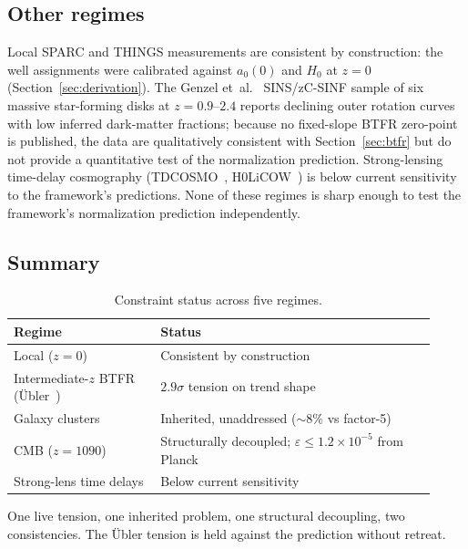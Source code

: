 \documentclass[11pt,a4paper]{article}
\numberwithin{equation}{section}
\numberwithin{table}{section}
\numberwithin{figure}{section}
\newcommand{\afid}{a_0}
\begin{document}
\subsection{Other regimes}
\label{sec:other-regimes}

Local SPARC and THINGS measurements are consistent by construction: the
well assignments were calibrated against $\afid(0)$ and $H_0$ at
$z = 0$ (Section~\ref{sec:derivation}). The Genzel et~al.\ \citep{Genzel2017}
SINS/zC-SINF sample of six massive star-forming disks at
$z = 0.9$--$2.4$ reports declining outer rotation curves with low
inferred dark-matter fractions; because no fixed-slope BTFR zero-point
is published, the data are qualitatively consistent with
Section~\ref{sec:btfr} but do not provide a quantitative test of the
normalization prediction. Strong-lensing time-delay cosmography
(TDCOSMO~\citep{Millon2020}, H0LiCOW~\citep{Wong2020}) is below current
sensitivity to the framework's predictions. None of these regimes is
sharp enough to test the framework's normalization prediction
independently.

\subsection{Summary}
\label{sec:constraint-summary}

\begin{table}[!ht]
\centering
\caption{Constraint status across five regimes.}
\label{tab:constraint-status}
\small
\begin{tabular}{p{0.32\linewidth} p{0.60\linewidth}}
\toprule
Regime & Status \\
\midrule
Local ($z = 0$)                        & Consistent by construction \\
Intermediate-$z$ BTFR ({\"U}bler~\citep{Ubler2017}) & $2.9\sigma$ tension on trend shape \\
Galaxy clusters~\citep{Pointecouteau2005}          & Inherited, unaddressed ($\sim 8\%$ vs factor-5) \\
CMB ($z = 1090$)                       & Structurally decoupled; $\varepsilon \leq 1.2 \times 10^{-5}$ from Planck \\
Strong-lens time delays                & Below current sensitivity \\
\bottomrule
\end{tabular}
\end{table}

One live tension, one inherited problem, one structural decoupling, two
consistencies. The {\"U}bler tension is held against the prediction
without retreat.
\end{document}
